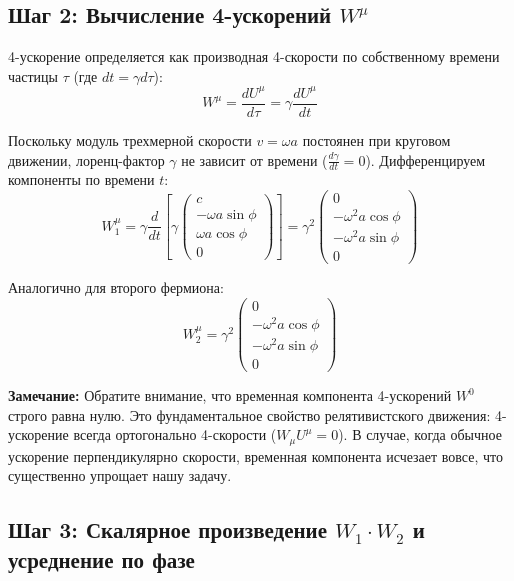 \documentclass[12pt,a4paper]{article}
\begin{document}
\subsection*{Шаг 2: Вычисление 4-ускорений $W^\mu$}

4-ускорение определяется как производная 4-скорости по собственному времени частицы $\tau$ (где $dt = \gamma d\tau$):
\begin{equation}
W^\mu = \frac{dU^\mu}{d\tau} = \gamma \frac{d U^\mu}{dt}
\end{equation}

Поскольку модуль трехмерной скорости $v = \omega a$ постоянен при круговом движении, лоренц-фактор $\gamma$ не зависит от времени ($\frac{d\gamma}{dt} = 0$). Дифференцируем компоненты по времени $t$:
\begin{equation}
W_1^\mu = \gamma \frac{d}{dt} \left[ \gamma \begin{pmatrix} c \\ -\omega a \sin\phi \\ \omega a \cos\phi \\ 0 \end{pmatrix} \right] = \gamma^2 \begin{pmatrix} 0 \\ -\omega^2 a \cos\phi \\ -\omega^2 a \sin\phi \\ 0 \end{pmatrix}
\end{equation}

Аналогично для второго фермиона:
\begin{equation}
W_2^\mu = \gamma^2 \begin{pmatrix} 0 \\ -\omega^2 a \cos\phi \\ -\omega^2 a \sin\phi \\ 0 \end{pmatrix}
\end{equation}

\textbf{Замечание:} Обратите внимание, что временная компонента 4-ускорений $W^0$ строго равна нулю. Это фундаментальное свойство релятивистского движения: 4-ускорение всегда ортогонально 4-скорости ($W_\mu U^\mu = 0$). В случае, когда обычное ускорение перпендикулярно скорости, временная компонента исчезает вовсе, что существенно упрощает нашу задачу.

\subsection*{Шаг 3: Скалярное произведение $W_1 \cdot W_2$ и усреднение по фазе}
\end{document}
